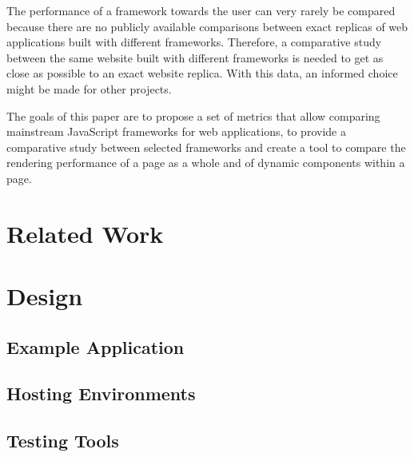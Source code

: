 \documentclass[a4paper, fontsize=11pt]{article}
\begin{document}
The performance of a framework towards the user can very rarely be compared because there are no publicly available comparisons between exact replicas of web applications built with different frameworks.
Therefore, a comparative study between the same website built with different frameworks is needed to get as close as possible to an exact website replica.
With this data, an informed choice might be made for other projects.

The goals of this paper are to propose a set of metrics that allow comparing mainstream JavaScript frameworks for web applications, to provide a comparative study between selected frameworks and create a tool to compare the rendering performance of a page as a whole and of dynamic components within a page.

\section{Related Work}\label{sec:relatedwork}
\section{Design}\label{sec:design}
\subsection{Example Application}\label{subsec:exampleapplication}
%
% 

\subsection{Hosting Environments}\label{subsec:hostingenvironments}
% 
% 

\subsection{Testing Tools}\label{subsec:testingtools}
% 
% 
\end{document}
